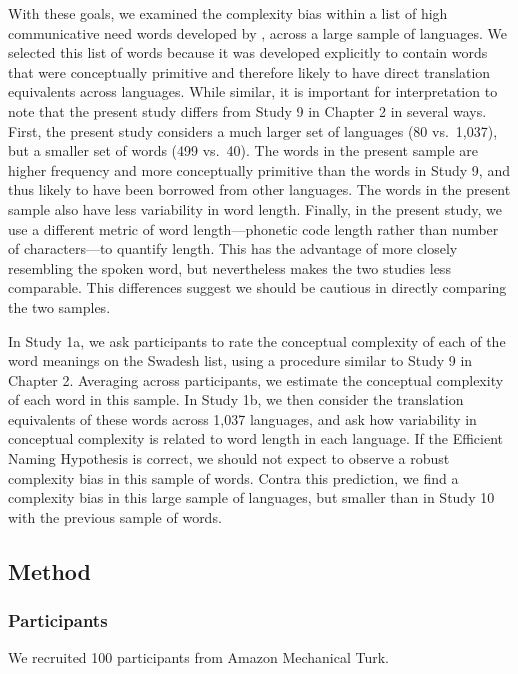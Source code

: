 With these goals, we examined the complexity bias within a list of high communicative need words  developed by  , across a large sample of languages. We selected this list of words because it was developed explicitly to contain words that were conceptually primitive and therefore likely to have direct translation equivalents across languages. While similar, it is important for interpretation to note that the present study differs from Study 9 in Chapter 2 in several ways. First, the present study considers a much larger set of languages (80 vs.\ 1,037), but a smaller set of words (499 vs.\ 40). The words in the present sample are higher frequency and more conceptually primitive than the words in Study 9, and thus likely to have been borrowed from other languages. The words in the present sample also have less variability in word length. Finally, in the present study, we use a different metric of word length---phonetic code length rather than number of characters---to quantify length. This has the advantage of more closely resembling the spoken word, but nevertheless makes the two studies less comparable. This differences suggest we should be cautious in directly comparing the two samples. 

In Study 1a, we ask participants to rate the conceptual complexity of each of the word meanings on the Swadesh list, using a procedure similar to Study 9 in Chapter 2. Averaging across participants, we  estimate the conceptual complexity of each word in this sample.  In Study 1b, we then consider the translation equivalents of these words across 1,037 languages, and ask how variability in conceptual complexity is related to word length in each language. If the Efficient Naming Hypothesis is correct, we should not expect to observe a robust complexity bias in this sample of words. Contra this prediction, we find a complexity bias in this large sample of languages, but smaller than in Study 10 with the previous sample of words.


\subsection{Method}
\subsubsection{Participants} We recruited 100 participants from Amazon Mechanical Turk.
